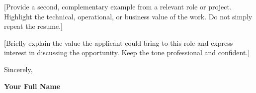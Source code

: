 \documentclass[11pt,a4paper]{letter}
\newcommand{\ApplicantName}{Your Full Name}
\begin{document}
\begin{letter}{}

[Provide a second, complementary example from a
relevant role or project. Highlight the technical,
operational, or business value of the work.
Do not simply repeat the resume.]


[Briefly explain the value the applicant could bring
to this role and express interest in discussing the
opportunity. Keep the tone professional and confident.]

\vspace{4pt}

Sincerely,

\vspace{18pt}

\textbf{\ApplicantName}

\end{letter}
\end{document}
